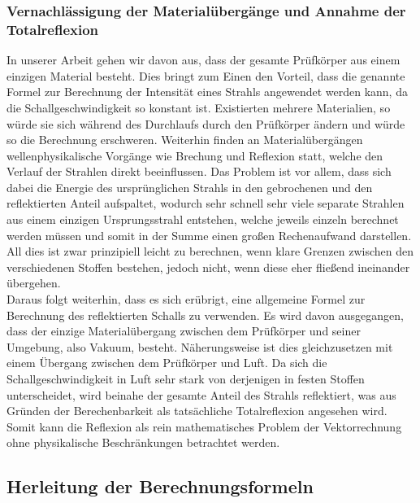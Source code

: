 \documentclass[reducespace,stylepage,semiarbeit]{spezidoc}
\begin{document}
\subsubsection{Vernachlässigung der Materialübergänge und Annahme der Totalreflexion}
In unserer Arbeit gehen wir davon aus, dass der gesamte Prüfkörper aus einem einzigen Material besteht. 
Dies bringt zum Einen den Vorteil, dass die genannte Formel zur Berechnung der Intensität eines Strahls angewendet werden kann, da die Schallgeschwindigkeit so konstant ist. 
Existierten mehrere Materialien, so würde sie sich während des Durchlaufs durch den Prüfkörper ändern und würde so die Berechnung erschweren. 
Weiterhin finden an Materialübergängen wellenphysikalische Vorgänge wie Brechung und Reflexion statt, welche den Verlauf der Strahlen direkt beeinflussen. 
Das Problem ist vor allem, dass sich dabei die Energie des ursprünglichen Strahls in den gebrochenen und den reflektierten Anteil aufspaltet, wodurch sehr schnell sehr viele separate Strahlen aus einem einzigen Ursprungsstrahl entstehen, welche jeweils einzeln berechnet werden müssen und somit in der Summe einen großen Rechenaufwand darstellen. 
All dies ist zwar prinzipiell leicht zu berechnen, wenn klare Grenzen zwischen den verschiedenen Stoffen bestehen, jedoch nicht, wenn diese eher \glqq fließend\grqq{} ineinander übergehen.\\
Daraus folgt weiterhin, dass es sich erübrigt, eine allgemeine Formel zur Berechnung des reflektierten Schalls zu verwenden. 
Es wird davon ausgegangen, dass der einzige Materialübergang zwischen dem Prüfkörper und seiner Umgebung, also Vakuum, besteht. 
Näherungsweise ist dies gleichzusetzen mit einem Übergang zwischen dem Prüfkörper und Luft. 
Da sich die Schallgeschwindigkeit in Luft sehr stark von derjenigen in festen Stoffen unterscheidet, wird beinahe der gesamte Anteil des Strahls reflektiert, was aus Gründen der Berechenbarkeit als tatsächliche Totalreflexion angesehen wird. 
Somit kann die Reflexion als rein mathematisches Problem der Vektorrechnung ohne physikalische Beschränkungen betrachtet werden.

\subsection{Herleitung der Berechnungsformeln}\label{sec:herleitung}

\end{document}
